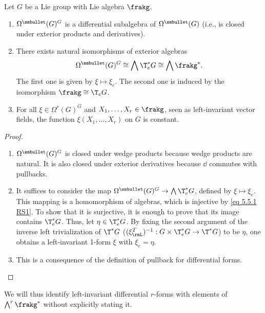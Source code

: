\begin{prop}[{{\cite[Prop.~5.5.2]{RS1}}}]\label{prop 5.5.2 RS1}
    Let $G$ be a Lie group with Lie algebra $\frakg$.
    \begin{enumerate}
        \item $\Omega^{\smbullet }(G)^G$ is a differential subalgebra of $\Omega^{\smbullet }(G)$ (i.e., is closed under exterior products and derivatives).
        \item There exists natural isomorphisms of exterior algebras
        \[\Omega^{\smbullet }(G)^G\cong \bigwedge \T^\ast_e G\cong \bigwedge \frakg^\ast.\]
        The first one is given by $\xi\mapsto \xi_e$. The second one is induced by the isomorphism $\frakg\cong \T_eG$.
        \item For all $\xi\in\Omega^r(G)^G$ and $X_1,\ldots,X_r\in\frakg$, seen as left-invariant vector fields, the function $\xi(X_1,\ldots,X_r)$ on $G$ is constant.
    \end{enumerate}
\end{prop}
\begin{proof}
    \begin{enumerate}
        \item $\Omega^{\smbullet }(G)^G$ is closed under wedge products because wedge products are natural. It is also closed under exterior derivatives because $\dd$ commutes with pullbacks.
        \item It suffices to consider the map $\Omega^{\smbullet }(G)^G\to\bigwedge \T^\ast_e G$, defined by $\xi\mapsto\xi_e$. This mapping is a homomorphism of algebras, which is injective by \eqref{eq 5.5.1 RS1}. To show that it is surjective, it is enough to prove that its image contains $\T^\ast_e G$. Thus, let $\eta\in \T^\ast_e G$. By fixing the second argument of the inverse left trivialization of $\T^\ast G$ ($(\xi_\rmL^T)^{-1}:G\times \T_e^\ast G\to \T^\ast G$) to be $\eta$, one obtains a left-invariant 1-form $\xi$ with $\xi_e=\eta$.
        \item  This is a consequence of the definition of pullback for differential forms.
    \end{enumerate}
\end{proof}

We will thus identify left-invariant differential $r$-forms with elements of $\bigwedge\nolimits^r\frakg^\ast$ without explicitly stating it. 


